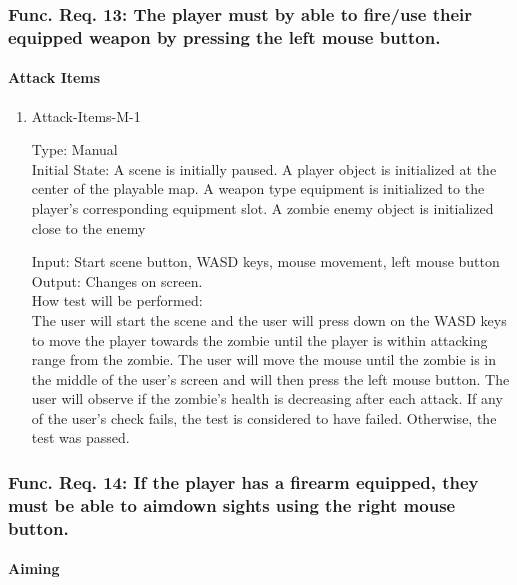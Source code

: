 \documentclass[12pt, titlepage]{article}
\begin{document}
\subsubsection{Func. Req. 13: The player must by able to fire/use their equipped weapon by pressing the left mouse button.}

\paragraph{Attack Items}

\begin{enumerate}

\item{Attack-Items-M-1\\}

Type: Manual \\
					
Initial State: A scene is initially paused. A player object is initialized at the center of the playable map. A weapon type equipment is initialized to the player's corresponding equipment slot. A zombie enemy object is initialized close to the enemy
					
Input: Start scene button, WASD keys, mouse movement, left mouse button\\
					
Output: Changes on screen.\\
					
How test will be performed:\\ The user will start the scene and the user will press down on the WASD keys to move the player towards the zombie until the player is within attacking range from the zombie. The user will move the mouse until the zombie is in the middle of the user's screen and will then press the left mouse button. The user will observe if the zombie's health is decreasing after each attack. If any of the user's check fails, the test is considered to have failed. Otherwise, the test was passed.

\end{enumerate}

\subsubsection{Func. Req. 14: If the player has a firearm equipped, they must be able to aimdown sights using the right mouse button.}

\paragraph{Aiming}
\end{document}
